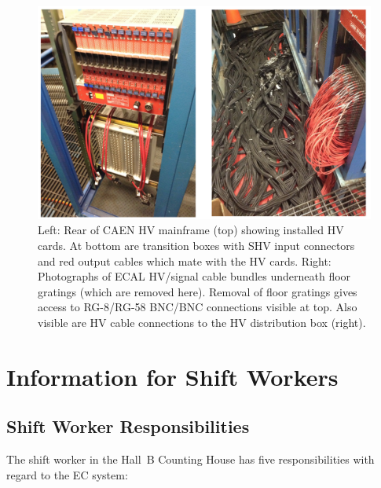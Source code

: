 \documentclass[letterpaper,10pt]{article}
\begin{document}
\begin{figure}[htbp]
  \centering
  \includegraphics[width= 5in, keepaspectratio = true]{Cable-routing}
  \vspace{2mm}
  \caption{Left: Rear of CAEN HV mainframe (top) showing installed HV cards.  At bottom are transition boxes with SHV input connectors and red output cables which mate with the HV cards.  Right: Photographs of ECAL HV/signal cable bundles underneath floor gratings (which are removed here). Removal of floor gratings gives access to RG-8/RG-58 BNC/BNC connections visible at top.  Also visible are HV cable connections to the HV distribution box (right).}
  \label{fc-layout-3} 
\end{figure}



\clearpage

\vfil
\eject


\section{Information for Shift Workers}

\subsection{Shift Worker Responsibilities}

The shift worker in the Hall~B Counting House has five responsibilities with regard to the EC
system:
\end{document}
